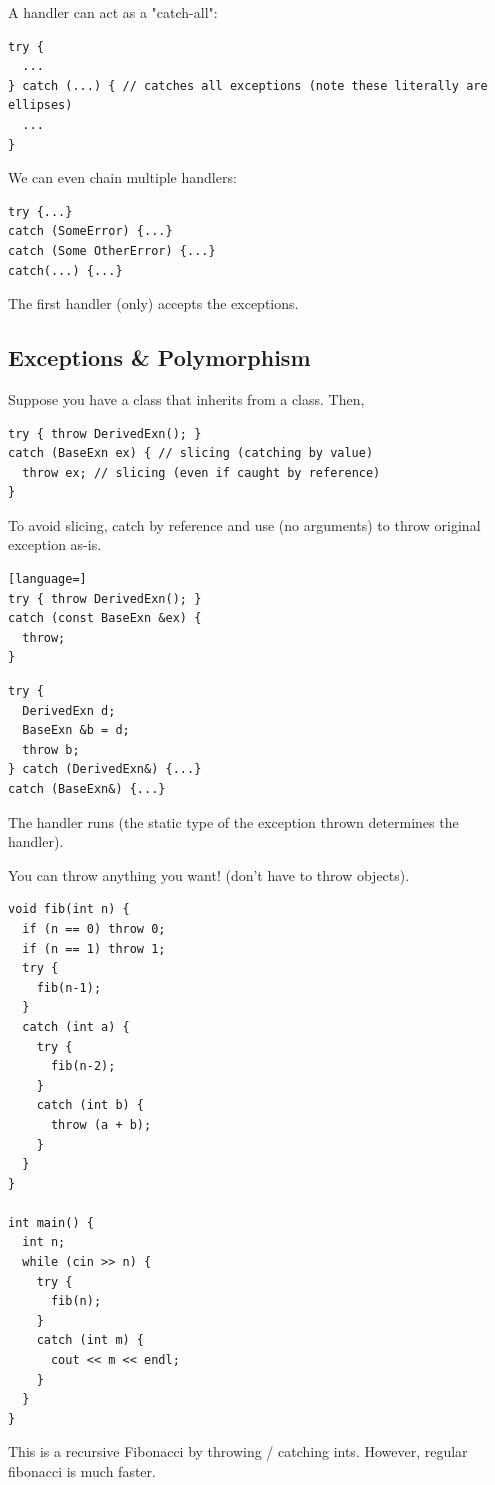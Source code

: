 \documentclass[english, 11pt]{article}
\begin{document}
A handler can act as a "catch-all":
\begin{lstlisting}
try {
  ...
} catch (...) { // catches all exceptions (note these literally are ellipses)
  ...
}
\end{lstlisting}
We can even chain multiple handlers:
\begin{lstlisting}
try {...}
catch (SomeError) {...}
catch (Some OtherError) {...}
catch(...) {...}
\end{lstlisting}
The first handler (only) accepts the exceptions.

\subsection{Exceptions \& Polymorphism}

Suppose you have a  class that inherits from a  class. Then,
\begin{lstlisting}
try { throw DerivedExn(); }
catch (BaseExn ex) { // slicing (catching by value)
  throw ex; // slicing (even if caught by reference)
}
\end{lstlisting}
To avoid slicing, catch by reference and use  (no arguments) to throw original exception as-is.
\begin{lstlisting}[language=]
try { throw DerivedExn(); }
catch (const BaseExn &ex) {
  throw;
}
\end{lstlisting}
\begin{note}
  \begin{lstlisting}
try {
  DerivedExn d;
  BaseExn &b = d;
  throw b;
} catch (DerivedExn&) {...}
catch (BaseExn&) {...}
  \end{lstlisting}
The  handler runs (the static type of the exception thrown determines the handler).
\end{note}
You can throw anything you want! (don't have to throw objects).
\begin{exmp}
\begin{lstlisting}
void fib(int n) {
  if (n == 0) throw 0;
  if (n == 1) throw 1;
  try {
    fib(n-1);
  }
  catch (int a) {
    try {
      fib(n-2);
    }
    catch (int b) {
      throw (a + b);
    }
  }
}

int main() {
  int n;
  while (cin >> n) {
    try {
      fib(n);
    }
    catch (int m) {
      cout << m << endl;
    }
  }
}
\end{lstlisting}
This is a recursive Fibonacci by throwing / catching ints. However, regular fibonacci is much faster.
\end{exmp}
\end{document}
